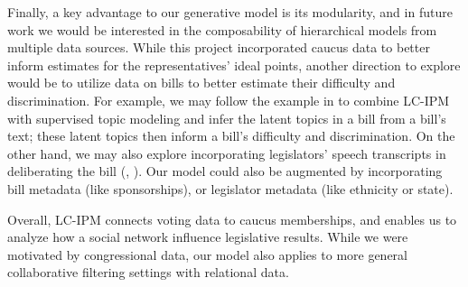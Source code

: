 \documentclass{article}
\begin{document}
Finally, a key advantage to our generative model is its modularity, and in future work we would be interested in the composability of hierarchical models from multiple data sources. While this project incorporated caucus data to better inform estimates for the representatives' ideal points, another direction to explore would be to utilize data on bills to better estimate their difficulty and discrimination. For example, we may follow the example in \cite{Gerrish2011} to combine LC-IPM with supervised topic modeling and infer the latent topics in a bill from a bill's text; these latent topics then inform a bill's difficulty and discrimination. On the other hand, we may also explore incorporating legislators' speech transcripts in deliberating the bill (\cite{Quinn2006}, \cite{Thomas2006}). Our model could also be augmented by incorporating bill metadata (like sponsorships), or legislator metadata (like ethnicity or state). \par

Overall, LC-IPM connects voting data to caucus memberships, and enables us to analyze how a social network influence legislative results. While we were motivated by congressional data, our model also applies to more general collaborative filtering settings with relational data.

\newpage



%
%
\end{document}
